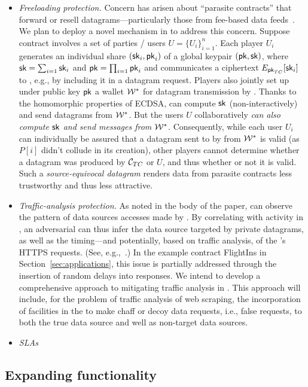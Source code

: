 \begin{itemize}
\item{\em Freeloading protection.} Concern has arisen about ``parasite contracts'' that forward or resell datagrams---particularly those from fee-based data feeds~\cite{}. We plan to deploy a novel mechanism in \tc to address this concern. Suppose contract \reqcont involves a set of parties / users $U = \{U_i\}_{i=1}^n$. Each player $U_i$ generates an individual share $({\sf sk}_i, {\sf pk}_i)$ of a global keypair $({\sf pk}, {\sf sk})$, where ${\sf sk} = \sum_{i=1} {\sf sk}_i$ and ${\sf pk} = \prod_{i=1} {\sf pk}_i$ and communicates a ciphertext $E_{{\sf pk}_{TC}}[{\sf sk}_i]$ to \tcont, e.g., by including it in a datagram request. Players also jointly set  up under public key ${\sf pk}$ a wallet ${\cal W}^*$ for datagram transmission by \tcont. Thanks to the homomorphic properties of ECDSA, \tcont can compute ${\sf sk}$ (non-interactively) and send datagrams from ${\cal W}^*$. But the users $U$ collaboratively \emph{can also compute ${\sf sk}$ and send messages from ${\cal W}^*$}. Consequently, while each user $U_i$ can individually be assured that a datagram sent to \reqcont by \tcont from ${\cal W}^*$ is valid (as $P[i]$ didn't collude in its creation), other players cannot determine whether a datagram was produced by ${\cal C}_{TC}$ or $U$, and thus whether or not it is valid. Such a \emph{source-equivocal datagram} renders data from parasite contracts less trustworthy and thus less attractive. 
\item{\em Traffic-analysis protection.} As noted in the body of the paper, \medname can observe the pattern of data sources accesses made by \tc. By correlating with activity in \tcont, an adversarial \medname can thus infer the data source targeted by private datagrams, as well as the timing---and potentially, based on traffic analysis, of the \encname's HTTPS requests. (See, e.g.,~\cite{chen2010side}.) In the example contract {\sf FlightIns} in Section~\ref{sec:applications}, this issue is partially addressed through the insertion of random delays into \tc responses. We intend to develop a comprehensive approach to mitigating traffic analysis in \tc. This approach will include, for the problem of traffic analysis of web scraping, the incorporation of facilities in the \encname to make chaff or decoy data requests, i.e., false requests, to both the true data source and well as non-target data sources. 
\item{\em SLAs}
\end{itemize}

\subsection{Expanding \tc functionality}

